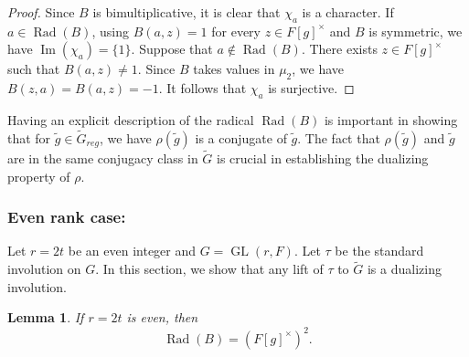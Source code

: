 \documentclass[11pt, a4paper, reqno]{amsart}
\newtheorem{lemma}[theorem]{Lemma}
\theoremstyle{definition}
\theoremstyle{remark}
\theoremstyle{example}
\theoremstyle{note}
\numberwithin{equation}{section}
\DeclareMathOperator{\GL}{GL}
\DeclareMathOperator{\Rad}{Rad}
\begin{document}
\begin{proof}
Since $B$ is bimultiplicative, it is clear that $\chi_{a}$ is a character.  If
$a\in\Rad(B)$, using $B(a,z)=1$ for every $z \in F[g]^{\times}$ and $B$ is symmetric, we have $\operatorname{Im}(\chi_a)=\{1\}.$ Suppose that $a\notin\Rad(B)$. There exists $z\in F[g]^{\times}$ such that $B(a,z)\neq 1$. Since $B$ takes values in $\mu_{2}$, we have $B(z,a)=B(a,z)=-1$. It follows that $\chi_{a}$ is surjective. 
\end{proof}

Having an explicit description of the radical $\Rad(B)$ is important in showing that for $\tilde{g}\in \widetilde{G}_{reg}$, we have $\rho(\tilde{g})$ is a conjugate of $\tilde{g}$. The fact that $\rho(\tilde{g})$  and $\tilde{g}$ are in the same conjugacy class in $\widetilde{G}$ is crucial in establishing the dualizing property of $\rho$.



\subsubsection{Even rank case:} \label{Even rank case}
Let $r=2t$ be an even integer and $G=\GL(r,F)$. Let $\tau$ be the standard involution on $G$. In this section, we show that any lift of $\tau$ to $\widetilde{G}$ is a dualizing involution. \\

\begin{lemma}\label{prop:even-radical} If $r=2t$ is even, then 
\[\Rad(B)=(F[g]^\times)^{2}.\]
\end{lemma}
\end{document}
